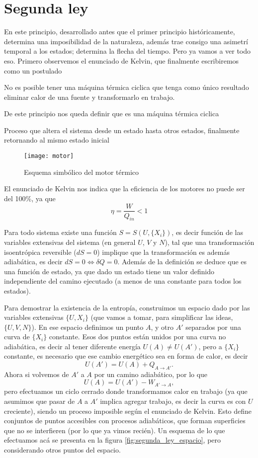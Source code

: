 \section{Segunda ley}
En este principio, desarrollado antes que el primer principio históricamente, determina una imposibilidad de la naturaleza, además trae consigo una asimetrí temporal a los estados; determina la flecha del tiempo.
Pero ya vamos a ver todo eso.
Primero observemos el enunciado de Kelvin, que finalmente escribiremos como un postulado
\begin{law}
No es posible tener una máquina térmica ciclica que tenga como único resultado eliminar calor de una fuente y transformarlo en trabajo.
\end{law}
De este principio nos queda definir que es una máquina térmica ciclica
\begin{definition}
Proceso que altera el sistema desde un estado hasta otros estados, finalmente retornando al mismo estado inicial
\begin{figure}[H]
\centering
\texttt{[image: motor]}
\caption{Esquema simbólico del motor térmico}
\end{figure}
\end{definition}
El enunciado de Kelvin nos indica que la eficiencia de los motores no puede ser del 100\%, ya que
\begin{equation}
\eta = \frac{W}{Q_{in}} < 1
\end{equation}
\begin{collorary}
Para todo sistema existe una función $S = S(U, \{X_i\})$, es decir función de las variables extensivas del sistema (en general $U$, $V$ y $N$), tal que una transformación isoentrópica reversible ($dS = 0$) implique que la transformación es además adiabática, es decir $dS = 0 \Leftrightarrow \delta Q = 0$.
Además de la definición se deduce que es una función de estado, ya que dado un estado tiene un valor definido independiente del camino ejecutado (a menos de una constante para todos los estados).
\end{collorary}
Para demostrar la existencia de la entropía, construimos un espacio dado por las variables extensivas $\{U,X_i\}$ (que vamos a tomar, para simplificar las ideas, $\{U,V,N\}$).
En ese espacio definimos un punto $A$, y otro $A'$ separados por una curva de $\{X_i\}$ constante.
Esos dos puntos están unidos por una curva no adiabática, es decir al tener diferente energía $U(A) \neq U(A')$, pero a $\{X_i\}$ constante, es necesario que ese cambio energético sea en forma de calor, es decir
\[U(A') = U(A) + Q_{A \to A'}.\]
Ahora si volvemos de $A'$ a $A$ por un camino adiabático, por lo que
\[U(A) = U(A') - W_{A' \to A},\]
pero efectuamos un ciclo cerrado donde transformamos calor en trabajo (ya que asumimos que pasar de $A$ a $A'$ implica agregar trabajo, es decir la curva es con $U$ creciente), siendo un proceso imposible según el enunciado de Kelvin.
Esto define conjuntos de puntos accesibles con procesos adiabáticos, que forman superficies que no se interfieren (por lo que ya vimos recién).
Un esquema de lo que efectuamos acá se presenta en la figura \ref{fig:segunda_ley_espacio}, pero considerando otros puntos del espacio.

